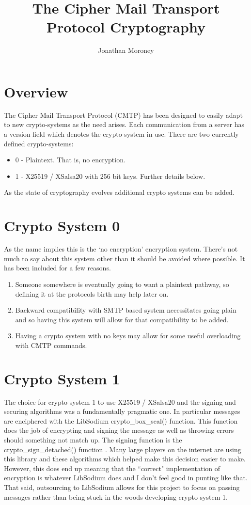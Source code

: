\documentclass[a4paper,11pt]{article}
\title{The Cipher Mail Transport Protocol Cryptography}
\author{Jonathan Moroney}
\begin{document}
\maketitle


\section{Overview}
The Cipher Mail Transport Protocol (CMTP) has been designed to easily adapt to new crypto-systems as the need arises. Each communication from a server has a version field which denotes the crypto-system in use. There are two currently defined crypto-systems:
\begin{itemize}
  \item 0 - Plaintext. That is, no encryption.
  \item 1 - X25519 / XSalsa20 with 256 bit keys. Further details below.
\end{itemize}
As the state of cryptography evolves additional crypto systems can be added.
\section{Crypto System 0}
As the name implies this is the `no encryption' encryption system. There's not much to say about this system other than it should be avoided where possible. It has been included for a few reasons.
\begin{enumerate}
  \item Someone somewhere is eventually going to want a plaintext pathway, so defining it at the protocols birth may help later on.
  \item Backward compatibility with SMTP based system necessitates going plain and so having this system will allow for that compatibility to be added.
  \item Having a crypto system with no keys may allow for some useful overloading with CMTP commands.
\end{enumerate}
\section{Crypto System 1}
The choice for crypto-system 1 to use X25519 / XSalsa20 and the signing and securing algorithms was a fundamentally pragmatic one. In particular messages are enciphered with the LibSodium crypto\_box\_seal() \cite{crypto-box-seal} function. This function does the job of encrypting and signing the message as well as throwing errors should something not match up. The signing function is the crypto\_sign\_detached() function \cite{crypto-sign}. Many large players on the internet are using this library and these algorithms which helped make this decision easier to make. However, this does end up meaning that the ``correct" implementation of encryption is whatever LibSodium does and I don't feel good in punting like that. That said, outsourcing to LibSodium allows for this project to focus on passing messages rather than being stuck in the woods developing crypto system 1.



\end{document}
